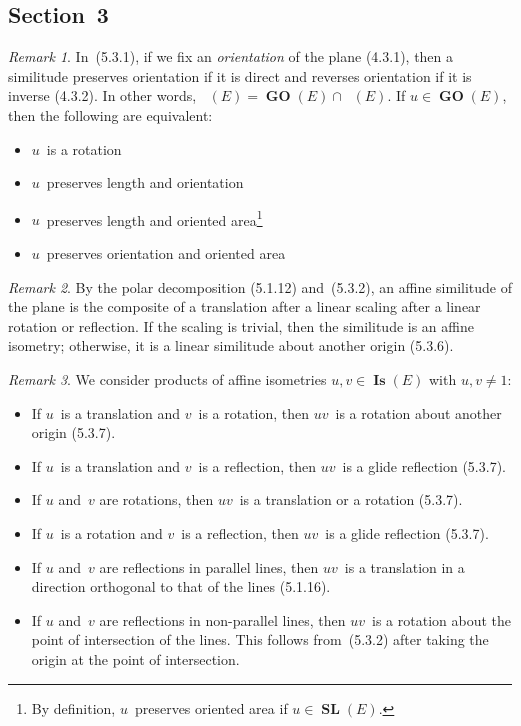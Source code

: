\documentclass[letterpaper,12pt]{article}
\newcommand{\sect}{\cap}
\DeclareMathOperator{\GL}{\mathbf{GL}}
\DeclareMathOperator{\GLp}{\GL^+}
\DeclareMathOperator{\SL}{\mathbf{SL}}
\DeclareMathOperator{\GO}{\mathbf{GO}}
\DeclareMathOperator{\GOp}{\GO^+}
\DeclareMathOperator{\Is}{\mathbf{Is}}
\theoremstyle{definition}
\theoremstyle{remark}
\newtheorem*{rmk}{Remark}
\begin{document}
\subsection*{Section~3}
\begin{rmk}
In~(5.3.1), if we fix an \emph{orientation} of the plane (4.3.1), then a similitude preserves orientation if it is direct and reverses orientation if it is inverse (4.3.2). In other words, \(\GOp(E)=\GO(E)\sect\GLp(E)\). If \(u\in\GO(E)\), then the following are equivalent:
\begin{itemize}[itemsep=0pt]
\item \(u\)~is a rotation
\item \(u\)~preserves length and orientation
\item \(u\)~preserves length and oriented area\footnote{By definition, \(u\)~preserves oriented area if \(u\in\SL(E)\).}
\item \(u\)~preserves orientation and oriented area
\end{itemize}
\end{rmk}

\begin{rmk}
By the polar decomposition (5.1.12) and~(5.3.2), an affine similitude of the plane is the composite of a translation after a linear scaling after a linear rotation or reflection. If the scaling is trivial, then the similitude is an affine isometry; otherwise, it is a linear similitude about another origin (5.3.6).
\end{rmk}

\begin{rmk}
We consider products of affine isometries \(u,v\in\Is(E)\) with \(u,v\ne 1\):
\begin{itemize}[itemsep=0pt]
\item If \(u\)~is a translation and \(v\)~is a rotation, then \(uv\)~is a rotation about another origin (5.3.7).
\item If \(u\)~is a translation and \(v\)~is a reflection, then \(uv\)~is a glide reflection (5.3.7).
\item If \(u\) and~\(v\) are rotations, then \(uv\)~is a translation or a rotation (5.3.7).
\item If \(u\)~is a rotation and \(v\)~is a reflection, then \(uv\)~is a glide reflection (5.3.7).
\item If \(u\) and~\(v\) are reflections in parallel lines, then \(uv\)~is a translation in a direction orthogonal to that of the lines (5.1.16).
\item If \(u\) and~\(v\) are reflections in non-parallel lines, then \(uv\)~is a rotation about the point of intersection of the lines. This follows from~(5.3.2) after taking the origin at the point of intersection.
\end{itemize}
\end{rmk}
\end{document}
